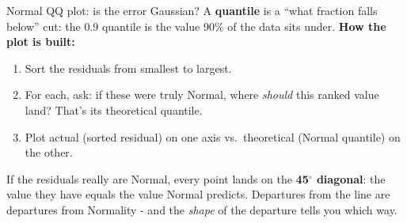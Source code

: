 \documentclass[aspectratio=169]{beamer}
\begin{document}
\begin{frame}{Normal QQ plot: is the error Gaussian?}
  A \textbf{quantile} is a ``what fraction falls below'' cut: the 0.9 quantile is the value 90\% of the data sits under.
  \vfill
  \textbf{How the plot is built:}
  \begin{enumerate}
    \item Sort the residuals from smallest to largest.
    \item For each, ask: if these were truly Normal, where \emph{should} this ranked value land? That's its theoretical quantile.
    \item Plot actual (sorted residual) on one axis vs.\ theoretical (Normal quantile) on the other.
  \end{enumerate}
  \vfill
  If the residuals really are Normal, every point lands on the \textbf{45$^\circ$ diagonal}: the value they have equals the value Normal predicts. Departures from the line are departures from Normality - and the \emph{shape} of the departure tells you which way.
\end{frame}
\end{document}
